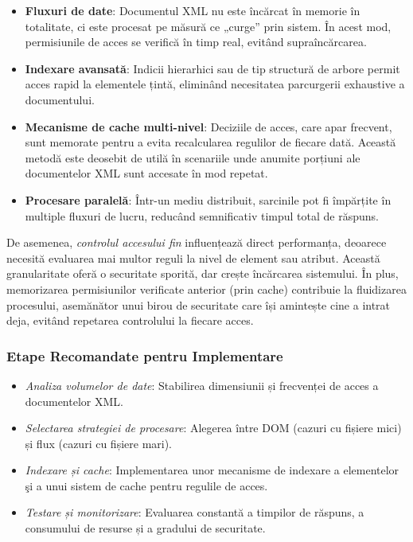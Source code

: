 \documentclass[runningheads]{llncs}
\begin{document}
\begin{itemize}
   \item \textbf{Fluxuri de date}: Documentul XML nu este încărcat în memorie în totalitate, ci este procesat pe măsură ce „curge” prin sistem. În acest mod, permisiunile de acces se verifică în timp real, evitând supraîncărcarea.
   \item \textbf{Indexare avansată}: Indicii hierarhici sau de tip structură de arbore permit acces rapid la elementele țintă, eliminând necesitatea parcurgerii exhaustive a documentului.
   \item \textbf{Mecanisme de cache multi-nivel}: Deciziile de acces, care apar frecvent, sunt memorate pentru a evita recalcularea regulilor de fiecare dată. Această metodă este deosebit de utilă în scenariile unde anumite porțiuni ale documentelor XML sunt accesate în mod repetat.
   \item \textbf{Procesare paralelă}: Într-un mediu distribuit, sarcinile pot fi împărțite în multiple fluxuri de lucru, reducând semnificativ timpul total de răspuns.
\end{itemize}

\noindent
De asemenea, \textit{controlul accesului fin} influențează direct performanța, deoarece necesită evaluarea mai multor reguli la nivel de element sau atribut. Această granularitate oferă o securitate sporită, dar crește încărcarea sistemului. În plus, memorizarea permisiunilor verificate anterior (prin cache) contribuie la fluidizarea procesului, asemănător unui birou de securitate care își amintește cine a intrat deja, evitând repetarea controlului la fiecare acces.

\subsubsection{Etape Recomandate pentru Implementare}

\begin{itemize}
   \item \textit{Analiza volumelor de date}: Stabilirea dimensiunii și frecvenței de acces a documentelor XML.
   \item \textit{Selectarea strategiei de procesare}: Alegerea între DOM (cazuri cu fișiere mici) și flux (cazuri cu fișiere mari).
   \item \textit{Indexare și cache}: Implementarea unor mecanisme de indexare a elementelor şi a unui sistem de cache pentru regulile de acces.
   \item \textit{Testare și monitorizare}: Evaluarea constantă a timpilor de răspuns, a consumului de resurse și a gradului de securitate.
\end{itemize}
\end{document}
